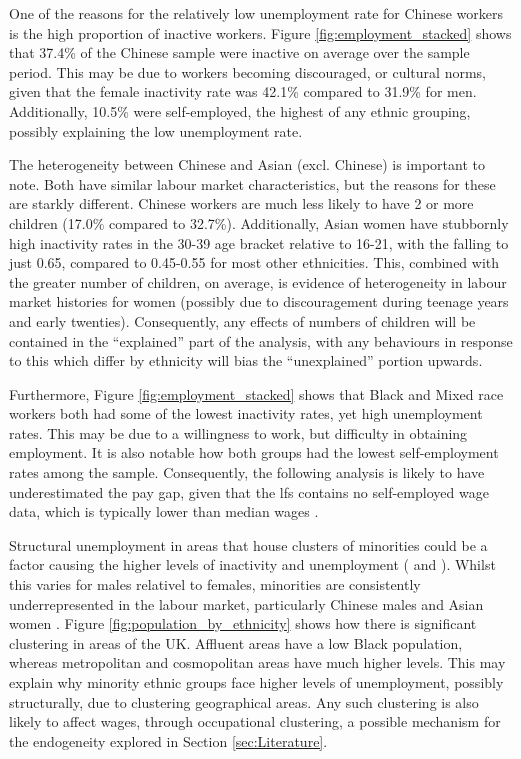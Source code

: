 \documentclass[class=article, crop=false]{standalone}
\begin{document}
One of the reasons for the relatively low unemployment rate for Chinese workers is the high proportion of inactive workers. Figure \ref{fig:employment_stacked} shows that 37.4\% of the Chinese sample were inactive on average over the sample period. This may be due to workers becoming discouraged, or cultural norms, given that the female inactivity rate was 42.1\% compared to 31.9\% for men. Additionally, 10.5\% were self-employed, the highest of any ethnic grouping, possibly explaining the low unemployment rate.

The heterogeneity between Chinese and Asian (excl. Chinese) is important to note. Both have similar labour market characteristics, but the reasons for these are starkly different. Chinese workers are much less likely to have 2 or more children (17.0\% compared to 32.7\%). Additionally, Asian women have stubbornly high inactivity rates in the 30-39 age bracket relative to 16-21, with the falling to just 0.65, compared to 0.45-0.55 for most other ethnicities. This, combined with the greater number of children, on average, is evidence of heterogeneity in labour market histories for women (possibly due to discouragement during teenage years and early twenties). Consequently, any effects of numbers of children will be contained in the \enquote{explained} part of the analysis, with any behaviours in response to this which differ by ethnicity will bias the \enquote{unexplained} portion upwards.

Furthermore, Figure \ref{fig:employment_stacked} shows that Black and Mixed race workers both had some of the lowest inactivity rates, yet high unemployment rates. This may be due to a willingness to work, but difficulty in obtaining employment. It is also notable how both groups had the lowest self-employment rates among the sample. Consequently, the following analysis is likely to have underestimated the pay gap, given that the \acrshort{lfs} contains no self-employed wage data, which is typically lower than median wages \citep{GOVf}.

Structural unemployment in areas that house clusters of minorities could be a factor causing the higher levels of inactivity and unemployment (\citet{Platt} and \citet{Berthoud}). Whilst this varies for males relativel to females, minorities are consistently underrepresented in the labour market, particularly Chinese males and Asian women \citep{Longhi2}. Figure \ref{fig:population_by_ethnicity} shows how there is significant clustering in areas of the UK. Affluent areas have a low Black population, whereas metropolitan and cosmopolitan areas have much higher levels. This may explain why minority ethnic groups face higher levels of unemployment, possibly structurally, due to clustering geographical areas. Any such clustering is also likely to affect wages, through occupational clustering, a possible mechanism for the endogeneity explored in Section \ref{sec:Literature}.
\end{document}
